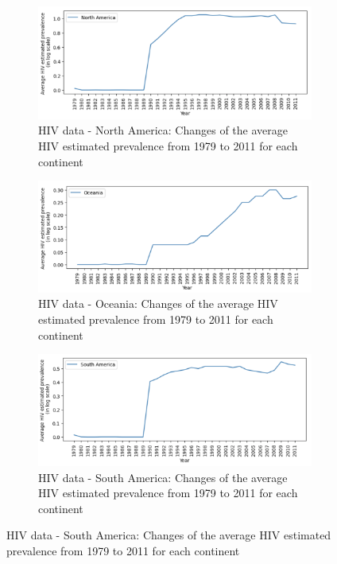 \documentclass[UTF8, letter]{article}
\begin{document}
\begin{figure}
	\centering
	\begin{subfigure}[b]{1\textwidth}
		\centering
		\includegraphics[width=\linewidth]{output_15.png}
		\caption{HIV data - North America: Changes of the average HIV estimated prevalence from 1979 to 2011 for each continent}
		\label{fig:line1}		
	\end{subfigure}
	\begin{subfigure}[b]{1\textwidth}
		\centering
		\includegraphics[width=\linewidth]{output_16.png}
		\caption{HIV data - Oceania: Changes of the average HIV estimated prevalence from 1979 to 2011 for each continent}
		\label{fig:line1}		
	\end{subfigure}
	\begin{subfigure}[b]{1\textwidth}
		\centering
		\includegraphics[width=\linewidth]{output_17.png}
		\caption{HIV data - South America: Changes of the average HIV estimated prevalence from 1979 to 2011 for each continent}
		\label{fig:line1}		
	\end{subfigure}					
\end{figure}
\end{document}
